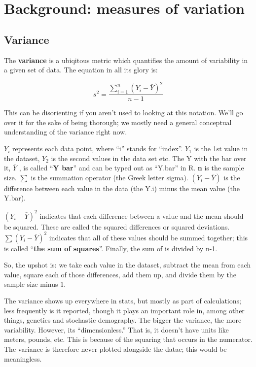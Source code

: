 \documentclass[]{book}
\theoremstyle{definition}
\theoremstyle{definition}
\theoremstyle{definition}
\theoremstyle{remark}
\begin{document}
\section{Background: measures of
variation}\label{background-measures-of-variation}

\subsection{Variance}\label{variance}

The \textbf{variance} is a ubiqitous metric which quantifies the amount
of variability in a given set of data. The equation in all its glory is:

\[s^2 = {\frac{\sum\limits_{i=1}^{n} \left(Y_{i} - \bar{Y}\right)^{2}} {n-1}}\]

This can be disorienting if you aren't used to looking at this notation.
We'll go over it for the sake of being thorough; we mostly need a
general conceptual understanding of the variance right now.

\(Y_{i}\) represents each data point, where ``i'' stands for ``index''.
\(Y_{1}\) is the 1st value in the dataset, \(Y_{2}\) is the second
values in the data set etc. The Y with the bar over it, \(\bar{Y}\) , is
called ``\textbf{Y bar}'' and can be typed out as ``Y.bar'' in R.
\textbf{n} is the sample size. \(\sum\) is the summation operator (the
Greek letter sigma). \(\left(Y_{i} - \bar{Y}\right)\) is the difference
between each value in the data (the Y.i) minus the mean value (the
Y.bar).

\((Y_{i} - \bar{Y})^{2}\) indicates that each difference between a value
and the mean should be squared. These are called the squared differences
or squared deviations. \(\sum(Y_{i} - \bar{Y})^{2}\) indicates that all
of these values should be summed together; this is called ``\textbf{the
sum of squares}''. Finally, the sum of is divided by n-1.

So, the upshot is: we take each value in the dataset, subtract the mean
from each value, square each of those differences, add them up, and
divide them by the sample size minus 1.

The variance shows up everywhere in stats, but mostly as part of
calculations; less frequently is it reported, though it plays an
important role in, among other things, genetics and stochastic
demography. The bigger the variance, the more variability. However, its
``dimensionless.'' That is, it doesn't have units like meters, pounds,
etc. This is because of the squaring that occurs in the numerator. The
variance is therefore never plotted alongside the datae; this would be
meaningless.
\end{document}
